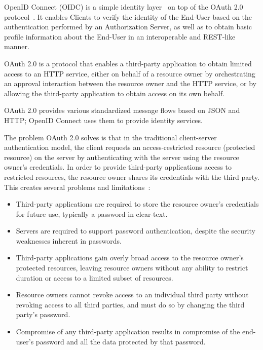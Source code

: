 OpenID Connect (OIDC) is a simple identity layer~\cite{siriwardenaOpenid2020, sakimuraOpenid2014}
on top of the OAuth 2.0 protocol~\cite{hardt2012oauth}.
It enables Clients to verify the identity of the End-User based on the authentication performed by an Authorization Server,
as well as to obtain basic profile information about the End-User in an interoperable and REST-like manner.

OAuth 2.0 is a protocol that enables a third-party application to obtain limited access to an HTTP service,
either on behalf of a resource owner by orchestrating an approval interaction between the resource owner
and the HTTP service, or by allowing the third-party application to obtain access on its own behalf.

OAuth 2.0 provides various standardized message flows based on JSON and HTTP;
OpenID Connect uses them to provide identity services.

The problem OAuth 2.0 solves is that in the traditional client-server authentication model,
the client requests an access-restricted resource (protected resource)
on the server by authenticating with the server using the resource owner's credentials.
In order to provide third-party applications access to restricted resources,
the resource owner shares its credentials with the third party.
This creates several problems and limitations~\cite{hardt2012oauth}:

\begin{itemize}
    \item Third-party applications are required to store the resource owner's credentials for future use, typically
    a password in clear-text.
    \item Servers are required to support password authentication, despite the security weaknesses inherent in passwords.
    \item Third-party applications gain overly broad access to the resource owner's protected resources,
    leaving resource owners without any ability to restrict duration or access to a limited subset of resources.
    \item Resource owners cannot revoke access to an individual third party without revoking access to all third parties,
    and must do so by changing the third party's password.
    \item Compromise of any third-party application results in compromise of the end-user's password
    and all the data protected by that password.
\end{itemize}

